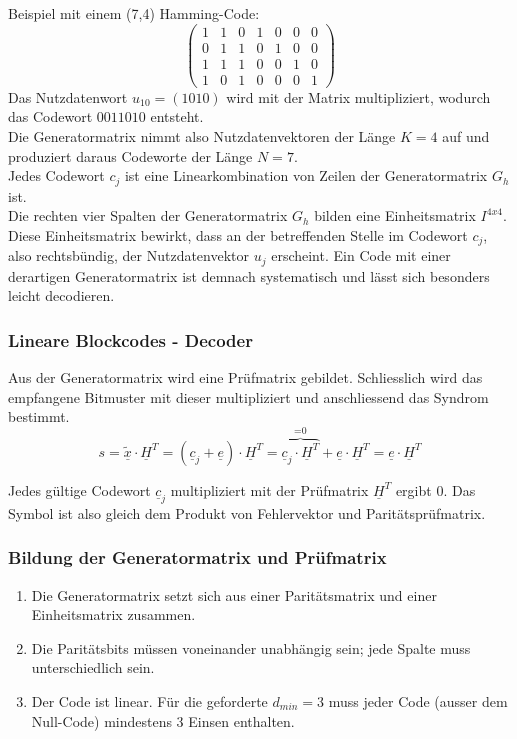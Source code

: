 Beispiel mit einem (7,4) Hamming-Code:
\[
    \begin{pmatrix}
    1 & 1 & 0 & 1 & 0 & 0 & 0 \\
    0 & 1 & 1 & 0 & 1 & 0 & 0 \\
    1 & 1 & 1 & 0 & 0 & 1 & 0 \\
    1 & 0 & 1 & 0 & 0 & 0 & 1 
    \end{pmatrix}
\]
Das Nutzdatenwort $u_{10} = (1010)$ wird mit der Matrix multipliziert, wodurch das Codewort $0011010$ entsteht. \\
Die Generatormatrix nimmt also Nutzdatenvektoren der Länge $K=4$ auf und produziert daraus Codeworte der Länge $N=7$. \\
Jedes Codewort $c_j$ ist eine Linearkombination von Zeilen der Generatormatrix $G_h$ ist. \\
Die rechten vier Spalten der Generatormatrix $G_h$ bilden eine Einheitsmatrix $I^{4x4}$. Diese Einheitsmatrix bewirkt, dass an der betreffenden Stelle im Codewort $c_j$, also rechtsbündig, der Nutzdatenvektor $u_j$ erscheint. Ein Code mit einer derartigen Generatormatrix ist demnach systematisch und lässt sich besonders leicht decodieren.
\vfill
\subsubsection{Lineare Blockcodes - Decoder}%
\label{ssub:lineare_blockcodes_decoder}

Aus der Generatormatrix wird eine Prüfmatrix gebildet. Schliesslich wird das empfangene Bitmuster mit dieser multipliziert und anschliessend das Syndrom bestimmt.
\[
    s = \underline{\tilde{x}} \cdot \underline{H}^T = (\underline{c}_j + \underline{e}) \cdot \underline{H}^T=\overbrace{\underline{c}_j \cdot \underline{H}^T}^{\text{=0}}+\underline{e} \cdot \underline{H}^T=\underline{e} \cdot \underline{H}^T
\]

Jedes gültige Codewort $\underline{c}_j$ multipliziert mit der Prüfmatrix $\underline{H}^T$ ergibt $0$. Das Symbol ist also gleich dem Produkt von Fehlervektor und Paritätsprüfmatrix.\\

\subsubsection{Bildung der Generatormatrix und Prüfmatrix}%
\label{ssub:bildung_der_generatormatrix}

\begin{enumerate}
    \item Die Generatormatrix setzt sich aus einer Paritätsmatrix und einer Einheitsmatrix zusammen.
    \item Die Paritätsbits müssen voneinander unabhängig sein; jede Spalte muss unterschiedlich sein.
    \item Der Code ist linear. Für die geforderte $d_{min} = 3$ muss jeder Code (ausser dem Null-Code) mindestens 3 Einsen enthalten.
\end{enumerate}


